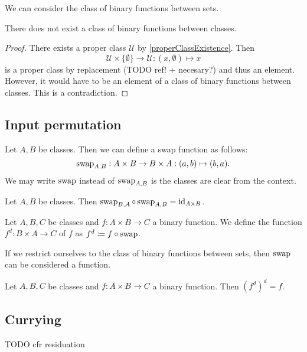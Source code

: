 We can consider the class of binary functions between sets.
\begin{lemma}
There does not exist a class of binary functions between classes.
\end{lemma}
\begin{proof}
There exists a proper class $\mathcal{U}$ by \ref{properClassExistence}. Then
\[ \mathcal{U}\times \{\emptyset\}\to \mathcal{U}: (x,\emptyset) \mapsto x \]
is a proper class by replacement (TODO ref! + necesary?) and thus an element. However, it would have to be an element of a class of binary functions between classes. This is a contradiction.
\end{proof}

\subsection{Input permutation}

Let $A,B$ be classes. Then we can define a swap function as follows:
\[ \operatorname{swap}_{A,B}: A\times B \to B\times A: (a,b) \mapsto (b,a). \]
We may write $\operatorname{swap}$ instead of $\operatorname{swap}_{A,B}$ is the classes are clear from the context.

\begin{lemma}
Let $A, B$ be classes. Then $\operatorname{swap}_{B,A}\circ \operatorname{swap}_{A,B} = \operatorname{id}_{A\times B}$.
\end{lemma}

\begin{definition}
Let $A, B, C$ be classes and $f: A\times B \to C$ a binary function. We define the  function $f^d: B\times A \to C$ of $f$ as $f^d \coloneqq f\circ \operatorname{swap}$. 
\end{definition}

If we restrict ourselves to the class of binary functions between sets, then $\operatorname{swap}$ can be considered a function.

\begin{lemma}
Let $A, B, C$ be classes and $f: A\times B \to C$ a binary function. Then $(f^d)^d = f$.
\end{lemma}

\subsection{Currying}
TODO cfr residuation

